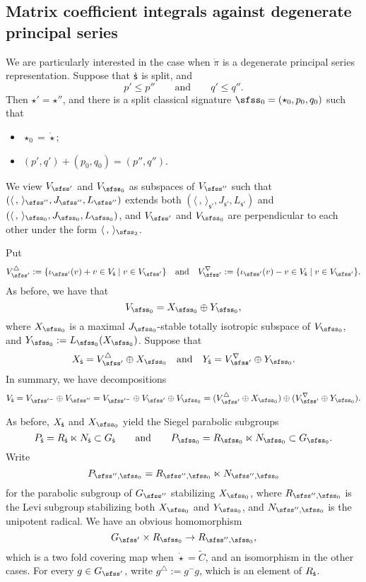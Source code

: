 \documentclass[12pt,a4paper]{amsart}
\newcommand{\la}{\langle}
\newcommand{\ra}{\rangle}
\newcommand{\be}{\begin {equation}}
\newcommand{\ee}{\end {equation}}
\numberwithin{equation}{section}
\theoremstyle{remark}
\begin{document}
\subsection{Matrix coefficient integrals against degenerate principal series}
\label{sec:DP}

We are particularly interested in the case when $\dot \pi$ is a degenerate principal series representation.
Suppose that ${\dot{\mathsf s}}$ is split,  and
\[
  p'\leq p''\qquad\textrm{and}\qquad q'\leq q''.
\]
Then $\star'=\star''$, and there is a  split classical signature $\sfss_0=(\star_0, p_0, q_0)$ such that
\begin{itemize}
\item $\star_0=\dot \star$;
  \item $(p', q')+(p_0, q_0)=(p'', q'')$.
\end{itemize}
We view $V_{\sfss'}$  and $V_{\sfss_0}$ as subspaces of $V_{\sfss''}$ such that $(\la\,,\,\ra_{\sfss''}, J_{\sfss''},L_{\sfss''})$  extends  both $(\la\,,\,\ra_{\mathsf s'}, J_{\mathsf s'}, L_{\mathsf s'})$ and $(\la\,,\,\ra_{\sfss_0}, J_{\sfss_0},L_{\sfss_0})$, and  $V_{\sfss'}$  and $V_{\sfss_0}$ are perpendicular to each other under the form $\la\, ,\,\ra_{\sfss_2}$.


Put
\[
   V_{\sfss'}^\triangle:=\{\iota_{\sfss'}(v)+v\in V_\dsfss \mid v\in V_{\sfss'}\}\quad\textrm{and}\quad V_{\sfss'}^\nabla:=\{\iota_{\sfss'}(v)-v\in V_\dsfss \mid v\in V_{\sfss'}\}.
 \]
As before, we have that
\[
  V_{\sfss_0}=X_{\sfss_0}\oplus Y_{\sfss_0},
\]
where $X_{\sfss_0}$ is a maximal $J_{\sfss_0}$-stable totally isotropic subspace of $V_{\sfss_0}$, and $Y_{\sfss_0}:=L_{\sfss_0}(X_{\sfss_0})$.
Suppose that
 \[
 X_{\dsfss}= V_{\sfss'}^\triangle \oplus X_{\sfss_0}\quad\textrm{and}\quad Y_{\dsfss}=V_{\sfss'}^\nabla \oplus Y_{\sfss_0}.
 \]
In summary, we have decompositions
\be\label{decomv0}
  V_{\dsfss}=V_{\sfss'^-}\oplus V_{\sfss''}= V_{\sfss'^-}\oplus V_{\sfss'}\oplus  V_{\sfss_0}= (V_{\sfss'}^\triangle \oplus X_{\sfss_0})\oplus (V_{\sfss'}^\nabla \oplus Y_{\sfss_0}).
\ee

As before, $X_{\dot{\mathsf s}}$ and $X_{\sfss_0}$ yield
 the Siegel parabolic subgroups
 \[
  P_{\dsfss}=R_{\dsfss}\ltimes N_\dsfss\subset G_\dsfss\qquad \textrm{and}\qquad P_{\sfss_0}=R_{\sfss_0}\ltimes N_{\sfss_0}\subset G_{\sfss_0}.
 \]
 Write
\be\label{parabolic}
  P_{\sfss'',\sfss_0}=R_{\sfss'',\sfss_0}\ltimes N_{\sfss'',\sfss_0}
\ee
for the parabolic subgroup of $G_{\sfss''}$ stabilizing $X_{\sfss_0}$, where $R_{\sfss'',\sfss_0}$ is the Levi subgroup stabilizing both $X_{\sfss_0}$ and $Y_{\sfss_0}$, and $N_{\sfss'',\sfss_0}$ is the unipotent radical. We have an obvious homomorphism
\be  \label{parabolic2}
  G_{\sfss'}\times R_{\sfss_0}\rightarrow R_{\sfss'',\sfss_0},
\ee
which is a two fold covering map when $\dot \star=\widetilde C$, and an isomorphism in the other cases.
For every $g\in G_{\sfss'}$, write $g^\triangle:= g^- g$, which is an element of $R_{{\dot{\mathsf s}}}$.
\end{document}

